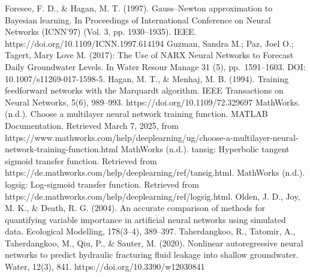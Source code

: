 \documentclass[10pt]{article}
\begin{document}
	\begin{thebibliography}{99} %
		Foresee, F. D., \& Hagan, M. T. (1997). Gauss–Newton approximation to Bayesian learning. In Proceedings of International Conference on Neural Networks (ICNN’97) (Vol. 3, pp. 1930–1935). IEEE. https://doi.org/10.1109/ICNN.1997.614194
		Guzman, Sandra M.; Paz, Joel O.; Tagert, Mary Love M. (2017): The Use of NARX Neural Networks to Forecast Daily Groundwater Levels. In Water Resour Manage 31 (5), pp. 1591–1603. DOI: 10.1007/s11269-017-1598-5.
		Hagan, M. T., \& Menhaj, M. B. (1994). Training feedforward networks with the Marquardt algorithm. IEEE Transactions on Neural Networks, 5(6), 989–993. https://doi.org/10.1109/72.329697
		MathWorks. (n.d.). Choose a multilayer neural network training function. MATLAB Documentation. Retrieved March 7, 2025, from https://www.mathworks.com/help/deeplearning/ug/choose-a-multilayer-neural-network-training-function.html
		MathWorks (n.d.). tansig: Hyperbolic tangent sigmoid transfer function. Retrieved from https://de.mathworks.com/help/deeplearning/ref/tansig.html.
		MathWorks (n.d.). logsig: Log-sigmoid transfer function. Retrieved from https://de.mathworks.com/help/deeplearning/ref/logsig.html.
		Olden, J. D., Joy, M. K., \& Death, R. G. (2004). An accurate comparison of methods for quantifying variable importance in artificial neural networks using simulated data. Ecological Modelling, 178(3–4), 389–397.
		Taherdangkoo, R., Tatomir, A., Taherdangkoo, M., Qiu, P., \& Sauter, M. (2020). Nonlinear autoregressive neural networks to predict hydraulic fracturing fluid leakage into shallow groundwater. Water, 12(3), 841. https://doi.org/10.3390/w12030841
	\end{thebibliography}
	
\end{document}
